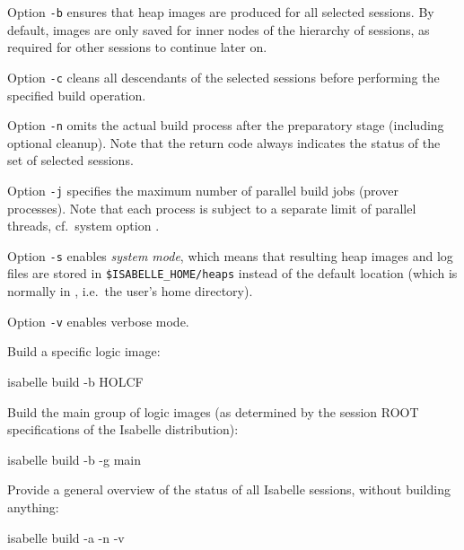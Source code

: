 \begin{isabellebody}
\begin{isamarkuptext}
  \medskip Option \verb|-b| ensures that heap images are
  produced for all selected sessions.  By default, images are only
  saved for inner nodes of the hierarchy of sessions, as required for
  other sessions to continue later on.

  \medskip Option \verb|-c| cleans all descendants of the
  selected sessions before performing the specified build operation.

  \medskip Option \verb|-n| omits the actual build process
  after the preparatory stage (including optional cleanup).  Note that
  the return code always indicates the status of the set of selected
  sessions.

  \medskip Option \verb|-j| specifies the maximum number of
  parallel build jobs (prover processes).  Note that each process is
  subject to a separate limit of parallel threads, cf.\ system option
  \hyperlink{system option.threads}{\mbox{}}.

  \medskip Option \verb|-s| enables \emph{system mode}, which
  means that resulting heap images and log files are stored in
  \verb|$ISABELLE_HOME/heaps| instead of the default location
  \hyperlink{setting.ISABELLE-OUTPUT}{\mbox{}} (which is normally in \hyperlink{setting.ISABELLE-HOME-USER}{\mbox{}}, i.e.\ the user's home directory).

  \medskip Option \verb|-v| enables verbose mode.%
\end{isamarkuptext}%
\isamarkuptrue%
%
\isamarkuptrue%
%
\begin{isamarkuptext}%
Build a specific logic image:
\begin{ttbox}
isabelle build -b HOLCF
\end{ttbox}

  \smallskip Build the main group of logic images (as determined by
  the session ROOT specifications of the Isabelle distribution):
\begin{ttbox}
isabelle build -b -g main
\end{ttbox}

  \smallskip Provide a general overview of the status of all Isabelle
  sessions, without building anything:
\begin{ttbox}
isabelle build -a -n -v
\end{ttbox}


\end{isamarkuptext}
\end{isabellebody}
